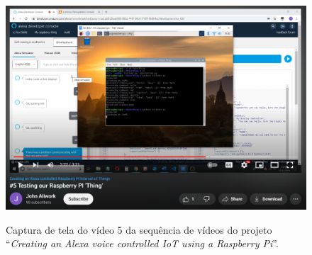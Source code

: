 \begin{figure}[htbp]
	\centering
	\caption{Captura de tela do vídeo 5 da sequência de vídeos do projeto ``\textit{Creating an Alexa voice controlled IoT using a Raspberry Pi}''.}
	\includegraphics[scale=0.75]{Imagens/testing_our_raspberrypi_thing.png}
	\label{fig:testing_our_raspberrypi_thing}
\end{figure}
